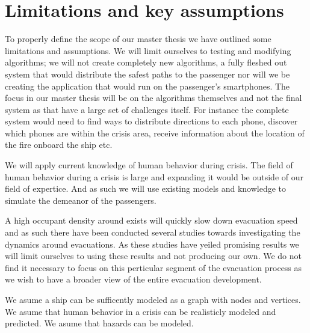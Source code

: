 \chapter{Limitations and key assumptions}
\label{ch:limitations}





To properly define the scope of our master thesis we have outlined
some limitations and assumptions. We will limit ourselves to testing and modifying algorithms;
we will not create completely new algorithms, a fully fleshed out system that would distribute the
safest paths to the passenger nor will we be creating the application that would run on the passenger's smartphones.
The focus in our master thesis will be on the algorithms themselves and not the final system as that have a large set
of challenges itself. For instance the complete system would need to find ways to distribute directions to each phone,
discover which phones are within the crisis area, receive information about the location of the fire onboard the ship etc.

We will apply current knowledge of human behavior during crisis. The field of human behavior during a crisis is large
and expanding it would be outside of our field of expertice. And as such we will use existing models and knowledge
to simulate the demeanor of the passengers. 

A high occupant density around exists will quickly slow down evacuation speed and as such there have been conducted several studies
towards investigating the dynamics around evacuations. As these studies have yeiled promising results we will
limit ourselves to using these results and not producing our own. We do not find it necessary to focus on this perticular segment 
of the evacuation process as we wish to have a broader view of the entire evacuation development.


We asume a ship can be sufficently modeled as a graph with nodes and vertices. 
We asume that human behavior in a crisis can be realisticly modeled and
predicted. We asume that hazards can be modeled.
